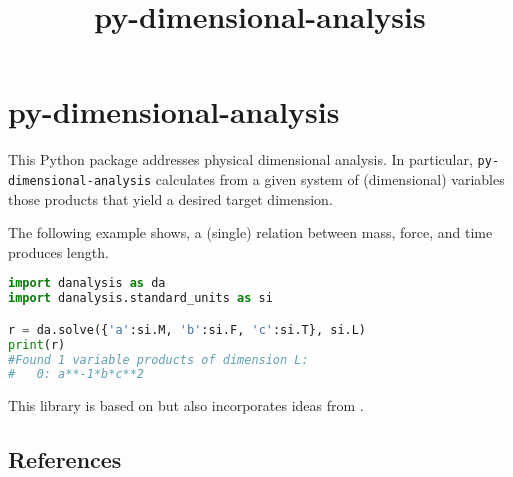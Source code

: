 \documentclass[11pt]{article}
\title{py-dimensional-analysis}
\date{}
\begin{document}
\maketitle

\section{py-dimensional-analysis}
This Python package addresses physical dimensional analysis. In particular, \texttt{py-dimensional-analysis} calculates from a given system of (dimensional) variables those products that yield a desired target dimension.


The following example shows, a (single) relation between mass, force, and time produces length.

\begin{lstlisting}[language=Python]
import danalysis as da
import danalysis.standard_units as si

r = da.solve({'a':si.M, 'b':si.F, 'c':si.T}, si.L)
print(r)
#Found 1 variable products of dimension L:
#   0: a**-1*b*c**2
\end{lstlisting}

This library is based on \cite{szirtes2007applied} but also incorporates ideas from \cite{santiago2019first, sonin2001dimensional}.

\subsection{References}

\begingroup
\renewcommand{\section}[2]{}%

\endgroup
\end{document}
